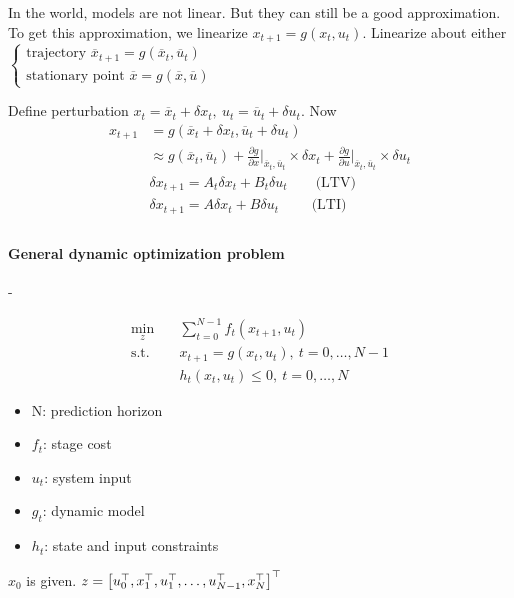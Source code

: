 \documentclass{article}
\begin{document}
In the world, models are not linear. But they can still be a good approximation. To get this approximation, we linearize $x_{t+1} = g(x_t, u_t)$.
Linearize about either $\left\{
  \begin{aligned}
    \text{trajectory }\overline{x}_{t+1} = g(\overline{x}_t, \overline{u}_t) \\
    \text{stationary point } \overline{x} = g(\overline{x}, \overline{u})
  \end{aligned}
\right.$

Define perturbation $x_t = \overline{x}_t + \delta x_t ,\ u_t = \overline{u}_t + \delta u_t$. 
Now 
\begin{align*}
  x_{t+1} &= g(\overline{x}_t+ \delta x_t, \overline{u}_t + \delta u_t) \\
  &\approx g(\overline{x}_t, \overline{u}_t) + \frac{\partial g}{\partial x} \bigg|_{\overline{x}_t, \overline{u}_t}\times \delta x_t + \frac{\partial g}{\partial u}\bigg|_{\overline{x}_t, \overline{u}_t}\times \delta u_t\\
  & \delta x_{t+1} = A_t \delta x_t + B_t \delta u_t  \qquad\text{(LTV)} \\
  & \delta x_{t+1} = A \delta x_t + B \delta u_t  \qquad\text{     (LTI)} \\
\end{align*}

\paragraph{General dynamic optimization problem}- 

\begin{minipage}[t]{0.5\textwidth}
  \begin{align*}
    \min_z \quad &\sum_{t = 0}^{N-1}f_t(x_{t+1}, u_t) \\
    \text{s.t.} \quad &x_{t+1} = g(x_t, u_t),\  t = 0,\dots,N-1 \\ 
    &h_t(x_t, u_t) \leq 0,\  t = 0,\dots,N
  \end{align*}
\end{minipage}
\begin{minipage}[t]{0.5\textwidth}
  \begin{itemize}
    \item N: prediction horizon
    \item $f_t$: stage cost
    \item $u_t$: system input
    \item $g_t$: dynamic model
    \item $h_t$: state and input constraints
  \end{itemize}
\end{minipage}
$x_0$ is given.
$z = \begin{bmatrix} u_0^{\top}, x_1^{\top}, u_1^{\top},\dots,u_{N-1}^{\top}, x_N^{\top} \end{bmatrix}^{\top}$
\end{document}
